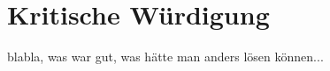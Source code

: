 \section{Kritische Würdigung} \thispagestyle{nomarkstyle}
blabla, was war gut, was hätte man anders lösen können...